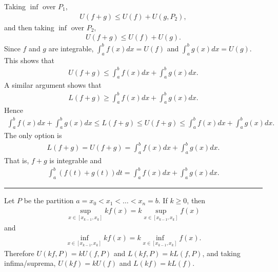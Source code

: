 \documentclass[letterpaper,10pt,english]{jupyterBook}
\begin{document}
\sphinxAtStartPar
Taking \(\inf\) over \(P_1\),
\begin{equation*}
\begin{split}
U(f+g) \leq U(f) + U(g,P_2),
\end{split}
\end{equation*}
\sphinxAtStartPar
and then taking \(\inf\) over \(P_2\),
\begin{equation*}
\begin{split}
U(f+g) \leq U(f)+U(g).
\end{split}
\end{equation*}
\sphinxAtStartPar
Since \(f\) and \(g\) are integrable, \(\int_a^bf(x)dx=U(f)\) and \(\int_a^bg(x)dx=U(g)\). This shows that
\begin{equation*}
\begin{split}
U(f+g) \leq \int_a^bf(x)dx + \int_a^bg(x)dx.
\end{split}
\end{equation*}
\sphinxAtStartPar
A similar argument shows that
\begin{equation*}
\begin{split}
L(f+g) \geq \int_a^bf(x)dx + \int_a^bg(x)dx.
\end{split}
\end{equation*}
\sphinxAtStartPar
Hence
\begin{equation*}
\begin{split}
\int_a^bf(x)dx + \int_a^bg(x)dx \leq L(f+g) \leq U(f+g) \leq \int_a^bf(x)dx + \int_a^bg(x)dx.
\end{split}
\end{equation*}
\sphinxAtStartPar
The only option is
\begin{equation*}
\begin{split}
L(f+g)=U(f+g)=\int_a^bf(x)dx + \int_a^bg(x)dx.
\end{split}
\end{equation*}
\sphinxAtStartPar
That is, \(f+g\) is integrable and
\begin{equation*}
\begin{split}
\int_a^b(f(t)+g(t))dt = \int_a^bf(x)dx + \int_a^bg(x)dx.
\end{split}
\end{equation*}

\bigskip\hrule\bigskip


\sphinxAtStartPar
{\hyperref[\detokenize{Problems:id71}]{}} Let \(P\) be the partition \(a=x_0<x_1<\ldots<x_n=b\). If \(k\geq 0\), then
\begin{equation*}
\begin{split}
\sup_{x\in[x_{k-1},x_k]}kf(x) = k\sup_{x\in[x_{k-1},x_k]}f(x)
\end{split}
\end{equation*}
\sphinxAtStartPar
and
\begin{equation*}
\begin{split}
\inf_{x\in[x_{k-1},x_k]}kf(x) = k\inf_{x\in[x_{k-1},x_k]}f(x).
\end{split}
\end{equation*}
\sphinxAtStartPar
Therefore \(U(kf,P)=kU(f,P)\) and \(L(kf,P)=kL(f,P)\), and taking infima/suprema, \(U(kf)=kU(f)\) and \(L(kf)=kL(f)\).
\end{document}
